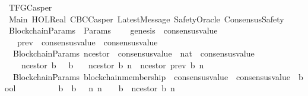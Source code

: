 %
\begin{isabellebody}%
%
%
\isadelimtheory
%
\endisadelimtheory
%
\isatagtheory
{}\isamarkupfalse%
\ TFGCasper\isanewline
\isanewline
{}\ Main\ HOL{\isachardot}Real\ CBCCasper\ LatestMessage\ SafetyOracle\ ConsensusSafety\isanewline
\isanewline
{}%
\endisatagtheory
{\isafoldtheory}%
%
\isadelimtheory
\isanewline
%
\endisadelimtheory
\isanewline
\isanewline
\isanewline
\isanewline
\isanewline
\isanewline
{}\isamarkupfalse%
\ BlockchainParams\ {\isacharequal}\ Params\ {\isacharplus}\isanewline
\ \ \ genesis\ {\isacharcolon}{\isacharcolon}\ consensus{\isacharunderscore}value\isanewline
\ \ \isanewline
\ \ \ prev\ {\isacharcolon}{\isacharcolon}\ {\isachardoublequoteopen}consensus{\isacharunderscore}value\ {\isasymRightarrow}\ consensus{\isacharunderscore}value{\isachardoublequoteclose}\isanewline
\isanewline
\isanewline
{}\isamarkupfalse%
\ {\isacharparenleft}\ BlockchainParams{\isacharparenright}\ n{\isacharunderscore}cestor\ {\isacharcolon}{\isacharcolon}\ {\isachardoublequoteopen}consensus{\isacharunderscore}value\ {\isacharasterisk}\ nat\ {\isasymRightarrow}\ consensus{\isacharunderscore}value{\isachardoublequoteclose}\isanewline
\ \ \isanewline
\ \ \ \ {\isachardoublequoteopen}n{\isacharunderscore}cestor\ {\isacharparenleft}b{\isacharcomma}\ {}{\isacharparenright}\ {\isacharequal}\ b{\isachardoublequoteclose}\isanewline
\ \ {\isacharbar}\ {\isachardoublequoteopen}n{\isacharunderscore}cestor\ {\isacharparenleft}b{\isacharcomma}\ n{\isacharparenright}\ {\isacharequal}\ n{\isacharunderscore}cestor\ {\isacharparenleft}prev\ b{\isacharcomma}\ n{\isacharminus}{}{\isacharparenright}{\isachardoublequoteclose}\isanewline
\isanewline
\isanewline
{}\isamarkupfalse%
\ {\isacharparenleft}\ BlockchainParams{\isacharparenright}\ blockchain{\isacharunderscore}membership\ {\isacharcolon}{\isacharcolon}\ {\isachardoublequoteopen}consensus{\isacharunderscore}value\ {\isasymRightarrow}\ consensus{\isacharunderscore}value\ {\isasymRightarrow}\ bool{\isachardoublequoteclose}\ {\isacharparenleft}\ {\isachardoublequoteopen}{\isasymdownharpoonright}{\isachardoublequoteclose}\ {}{}{\isacharparenright}\isanewline
\ \ \isanewline
\ \ \ \ {\isachardoublequoteopen}b{}\ {\isasymdownharpoonright}\ b{}\ {\isacharequal}\ {\isacharparenleft}{\isasymexists}\ n{\isachardot}\ n\ {\isasymin}\ {\isasymnat}\ {\isasymand}\ b{}\ {\isacharequal}\ n{\isacharunderscore}cestor\ {\isacharparenleft}b{}{\isacharcomma}\ n{\isacharparenright}{\isacharparenright}{\isachardoublequoteclose}\isanewline

\end{isabellebody}
